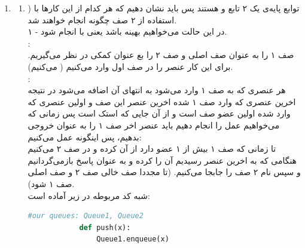 \documentclass{article}
\begin{document}
\begin{enumerate}
\begin{latin}
\begin{flushright}
\begin{lstlisting}[language=Python]
	while (curr_petrol <0 || !(Q.front == Q.rear) ):

		while curr_petrol <0 and !(Q.front == Q.rear):

			curr_petrol = curr_petrol - (Q.front.petrol - Q.front.distance)
			Q.dequeue()

			#if the first station is being considered as an starting point again, it means that all stations have been checked and there is no possible way to make a tour around the city
			if Q.front==station[0]:
				return -1;

		i += 1
		if i >= len(stations):
			i = 0
		Q.enqueue(stations[i])
		curr_petrol = curr_petrol + (Q.rear.petrol - Q.rear.distance)

	\end{lstlisting}
	\end{flushright}								
	\end{latin}
	\item
	\begin{enumerate}
		\item) توابع پایه‌ی یک  ۲ تابع  و  هستند پس باید نشان دهیم که هر کدام از این کار‌ها با استفاده از ۲ صف چگونه انجام خواهند شد.\\
		۱ - در این حالت می‌خواهیم  بهینه باشد یعنی با  انجام شود.\\
			: \\
			صف ۱ را به عنوان صف اصلی و صف ۲ را بع عنوان کمکی در نظر می‌گیریم. 
			برای این کار عنصر را در صف اول وارد می‌کنیم ( می‌کنیم).\\
			:\\
			هر عنصری که به صف ۱ وارد می‌شود به انتهای آن اضافه می‌شود در نتیجه اخرین عنصری که وارد صف ۱ شده اخرین عنصر این صف و اولین عنصری که وارد شده اولین عضو صف است و از آن‌ جایی که استک  است پس زمانی که می‌خواهیم عمل  را انجام دهیم باید عنصر اخر صف ۱ را به عنوان خروجی بدهیم، پس اینگونه عمل می‌‌کنیم:\\
			تا زمانی که صف ۱ بیش از ۱ عضو دارد از آن  کرده و در صف ۲  می‌کنیم هنگامی که به اخرین عنصر رسیدیم آن را  کرده و به عنوان پاسخ  بازمی‌گردانیم و سپس نام ۲ صف را جابجا می‌کنیم. (تا مجددا صف خالی صف ۲ و صف اصلی صف ۱ شود).\\
			شبه کد مربوطه در زیر آماده است:
			\begin{latin}
			\begin{flushright}				
			\begin{lstlisting}[language=Python]
			#our queues: Queue1, Queue2
			def push(x):
				Queue1.enqueue(x)


\end{lstlisting}
\end{flushright}
\end{latin}
\end{enumerate}
\end{enumerate}
\end{document}
